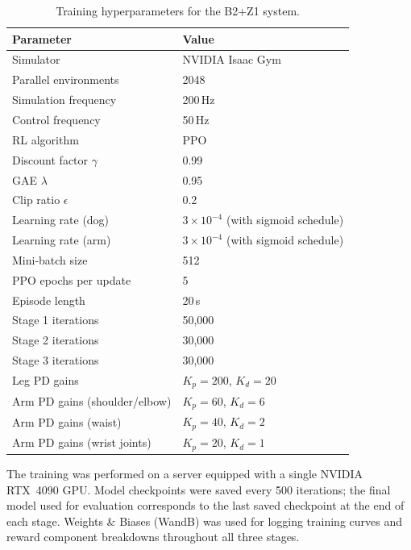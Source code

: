 \begin{table}[h]
\centering
\caption{Training hyperparameters for the B2+Z1 system.}
\label{tab:hparams}
\begin{tabular}{ll}
\hline
\textbf{Parameter} & \textbf{Value} \\
\hline
Simulator & NVIDIA Isaac Gym \\
Parallel environments & 2048 \\
Simulation frequency & 200\,Hz \\
Control frequency & 50\,Hz \\
RL algorithm & PPO~\cite{schulman2017proximal} \\
Discount factor $\gamma$ & 0.99 \\
GAE $\lambda$ & 0.95 \\
Clip ratio $\epsilon$ & 0.2 \\
Learning rate (dog) & $3 \times 10^{-4}$ (with sigmoid schedule) \\
Learning rate (arm) & $3 \times 10^{-4}$ (with sigmoid schedule) \\
Mini-batch size & 512 \\
PPO epochs per update & 5 \\
Episode length & 20\,s \\
Stage 1 iterations & 50,000 \\
Stage 2 iterations & 30,000 \\
Stage 3 iterations & 30,000 \\
Leg PD gains & $K_p = 200$, $K_d = 20$ \\
Arm PD gains (shoulder/elbow) & $K_p = 60$, $K_d = 6$ \\
Arm PD gains (waist) & $K_p = 40$, $K_d = 2$ \\
Arm PD gains (wrist joints) & $K_p = 20$, $K_d = 1$ \\
\hline
\end{tabular}
\end{table}

\noindent The training was performed on a server equipped with a single NVIDIA
RTX~4090 GPU.
Model checkpoints were saved every 500 iterations; the final model used for
evaluation corresponds to the last saved checkpoint at the end of each stage.
Weights \& Biases (WandB) was used for logging training curves and reward
component breakdowns throughout all three stages.
